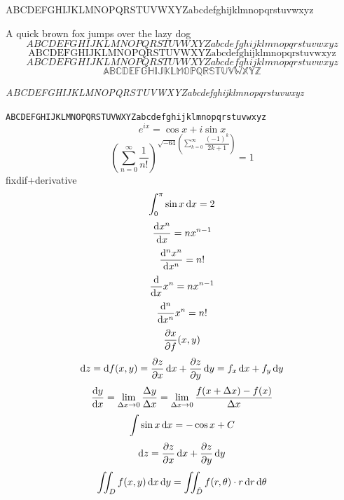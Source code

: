 \documentclass[lualatex,oneside,notitlepage,paper=a4paper,fontsize=12pt,fleqn]{jlreq}
\begin{document}
ABCDEFGHIJKLMNOPQRSTUVWXYZabcdefghijklmnopqrstuvwxyz\par
A quick brown fox jumps over the lazy dog
\[ABCDEFGHIJKLMNOPQRSTUVWXYZabcdefghijklmnopqrstuvwxyz\]
\[\mathrm{ABCDEFGHIJKLMNOPQRSTUVWXYZabcdefghijklmnopqrstuvwxyz}\]
\[\mathit{ABCDEFGHIJKLMNOPQRSTUVWXYZabcdefghijklmnopqrstuvwxyz}\]
\[\mathbb{ABCDEFGHIJKLMOPQRSTUVWXYZ}\]\par
\textit{ABCDEFGHIJKLMNOPQRSTUVWXYZabcdefghijklmnopqrstuvwxyz} \par
\texttt{ABCDEFGHIJKLMNOPQRSTUVWXYZabcdefghijklmnopqrstuvwxyz}
\[e^{ix}=\cos x+i\sin x\]
\[\left(\sum_{n=0}^{\infty}\frac{1}{n!}\right)^{\sqrt{-64}\left(\sum\limits_{k=0}^{\infty}\dfrac{(-1)^k}{2k+1}\right)}=1\]
fixdif+derivative
\[\int_0^{\pi}\sin x \odif{x}=2\]
\[\odv{x^n}{x}=nx^{n-1}\]
\[\odv[order=n]{x^n}{x}=n!\]
\[\odv*{x^n}{x}=nx^{n-1}\]
\[\odv*[order=n]{x^n}{x}=n!\]
\[\pdv{x}f(x,y)\]
\[\odif{z}=\odif{f} (x,y)=\pdv{z}{x}\odif{x}+\pdv{z}{y}\odif{y}=f_x\odif{x}+f_y\odif{y}\]
\[\odv{y}{x} = \lim_{\adif{x}\to 0}\adv{y}{x} = \lim_{\adif{x}\to 0}\frac{f(x+\adif{x}) - f(x)}{\adif{x}}\]
\[\int \sin x\odif{x} = -\cos x + C\]
\[\odif{z} = \pdv{z}{x}\odif{x} + \pdv{z}{y}\odif{y}\]
\[\iint_D f(x,y)\odif{x,y} = \iint_{\tilde{D}} f(r,\theta) \cdot r\odif{r,\theta}\]
\end{document}
